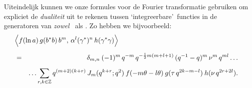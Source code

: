 \documentclass{book}
\begin{document}
Uiteindelijk kunnen we onze formules voor de Fourier transformatie gebruiken om
expliciet de {\em dualiteit\/} uit te rekenen tussen \lq integreerbare\rq\ functies
in de generatoren van {\em zowel\/} \Uq\ als \Aq\@.
Zo hebben we bijvoorbeeld:
\begin{eqnarray*}
      \lefteqn{\pairM{\vertL f(\ln a)\, g(b^* b)\, b^m}{\alpha^l (\gamma^*)^n \,h(\gamma^*\gamma)}}
\\
&\vertXL=&
      \delta_{m,n} \: (-1)^m \, q^{-m}\, q^{-\frac{1}{2}m(m+l+1)}\,
                      (q^{-1}-q)^m \,  \nu^m \, q^{ml} \ldots
\\
&\vertXL&
      \ldots  \sum_{r,k\in \ZZ}   q^{(m+2)(k+r)} \, \J{m}{q^{k+r}} \:
              f(-m\theta-l\theta) \: g(\tau\, q^{2k-m-l})  \: h(\nu\, q^{2r+2l}).
\end{eqnarray*}




\newpage

\end{document}
